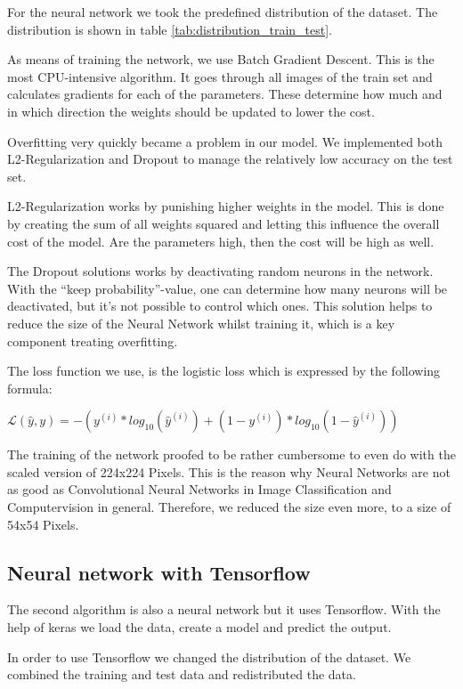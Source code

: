 \documentclass{article}
\begin{document}
For the neural network we took the predefined distribution of the dataset. 
The distribution is shown in table \ref{tab:distribution_train_test}.

As means of training the network, we use Batch Gradient Descent. 
This is the most CPU-intensive algorithm. 
It goes through all images of the train set and calculates gradients for each of the parameters. 
These determine how much and in which direction the weights should be updated to lower the cost.

Overfitting very quickly became a problem in our model. 
We implemented both L2-Regularization and Dropout to manage the relatively low accuracy on the test set. 

L2-Regularization works by punishing higher weights in the model. 
This is done by creating the sum of all weights squared and letting this influence the overall cost of the model. 
Are the parameters high, then the cost will be high as well.

The Dropout solutions works by deactivating random neurons in the network. 
With the “keep probability”-value, one can determine how many neurons will be deactivated, 
but it's not possible to control which ones. 
This solution helps to reduce the size of the Neural Network whilst training it, 
which is a key component treating overfitting.

The loss function we use, is the logistic loss which is expressed by the following formula:

$\mathcal{L}(\hat{y},y)=-(y^{(i)}*log_{10}(\hat{y}^{(i)})+(1-y^{(i)})*log_{10}(1-\hat{y}^{(i)}))$

The training of the network proofed to be rather cumbersome to even do with the scaled version of 224x224 Pixels. 
This is the reason why Neural Networks are not as good as Convolutional Neural Networks in Image 
Classification and Computervision in general. 
Therefore, we reduced the size even more, to a size of 54x54 Pixels.

\subsection{Neural network with Tensorflow}
\label{sec:neural_network_with_tensorflow}

The second algorithm is also a neural network but it uses Tensorflow. 
With the help of keras we load the data, create a model and predict the output.

In order to use Tensorflow we changed the distribution of the dataset.
We combined the training and test data and redistributed the data.
\end{document}

